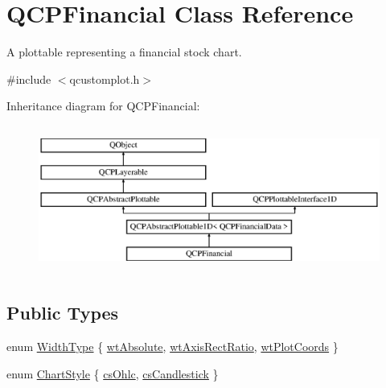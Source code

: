 \hypertarget{class_q_c_p_financial}{}\section{Q\+C\+P\+Financial Class Reference}
\label{class_q_c_p_financial}


A plottable representing a financial stock chart.  




{\ttfamily \#include $<$qcustomplot.\+h$>$}

Inheritance diagram for Q\+C\+P\+Financial\+:\begin{figure}[H]
\begin{center}
\leavevmode
\includegraphics[height=4.878048cm]{da/d7c/class_q_c_p_financial}
\end{center}
\end{figure}
\subsection*{Public Types}
\begin{DoxyCompactItemize}
\item 
enum \mbox{\hyperlink{class_q_c_p_financial_aef1761dda71a53dc5269685e9e492626}{Width\+Type}} \{ \mbox{\hyperlink{class_q_c_p_financial_aef1761dda71a53dc5269685e9e492626a0758d53bb6d7b4858e6bf8771edc934a}{wt\+Absolute}}, 
\mbox{\hyperlink{class_q_c_p_financial_aef1761dda71a53dc5269685e9e492626a806518350ea5814d28c29b0056e33ecd}{wt\+Axis\+Rect\+Ratio}}, 
\mbox{\hyperlink{class_q_c_p_financial_aef1761dda71a53dc5269685e9e492626af676bc8dbe700b96b333329c9dbfc30f}{wt\+Plot\+Coords}}
 \}
\item 
enum \mbox{\hyperlink{class_q_c_p_financial_a0f800e21ee98d646dfc6f8f89d10ebfb}{Chart\+Style}} \{ \mbox{\hyperlink{class_q_c_p_financial_a0f800e21ee98d646dfc6f8f89d10ebfba3a516016c9298d3e95dd82aa203c4390}{cs\+Ohlc}}, 
\mbox{\hyperlink{class_q_c_p_financial_a0f800e21ee98d646dfc6f8f89d10ebfbac803cbd39f26e3f206bcc7028679e62f}{cs\+Candlestick}}
 \}
\end{DoxyCompactItemize}
